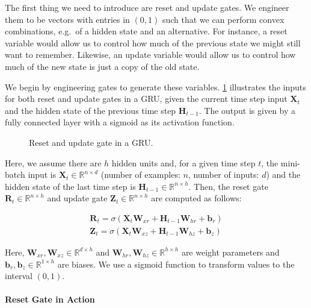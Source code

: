 The first thing we need to introduce are reset and update gates. We engineer them to be vectors with entries in $(0,1)$ such that we can perform convex combinations, e.g.\ of a hidden state and an alternative. For instance, a reset variable would allow us to control how much of the previous state we might still want to remember. Likewise, an update variable would allow us to control how much of the new state is just a copy of the old state.

We begin by engineering gates to generate these variables. \cref{fig:gru_1} illustrates the inputs for both reset and update gates in a GRU, given the current time step input $\mathbf{X}_t$ and the hidden state of the previous time step $\mathbf{H}_{t-1}$. The output is given by a fully connected layer with a sigmoid as its activation function.

\begin{figure}[hpt]
	\centering
	
	\caption{Reset and update gate in a GRU.}
	\label{fig:gru_1}
\end{figure}

Here, we assume there are $h$ hidden units and, for a given time step $t$, the mini-batch input is $\mathbf{X}_t \in \mathbb{R}^{n \times d}$ (number of examples: $n$, number of inputs: $d$) and the hidden state of the last time step is $\mathbf{H}_{t-1} \in \mathbb{R}^{n \times h}$. Then, the reset gate $\mathbf{R}_t \in \mathbb{R}^{n \times h}$ and update gate $\mathbf{Z}_t \in \mathbb{R}^{n \times h}$ are computed as follows:

$$
\begin{aligned}
\mathbf{R}_t = \sigma(\mathbf{X}_t \mathbf{W}_{xr} + \mathbf{H}_{t-1} \mathbf{W}_{hr} + \mathbf{b}_r)\\
\mathbf{Z}_t = \sigma(\mathbf{X}_t \mathbf{W}_{xz} + \mathbf{H}_{t-1} \mathbf{W}_{hz} + \mathbf{b}_z)
\end{aligned}
$$

Here, $\mathbf{W}_{xr}, \mathbf{W}_{xz} \in \mathbb{R}^{d \times h}$ and $\mathbf{W}_{hr}, \mathbf{W}_{hz} \in \mathbb{R}^{h \times h}$ are weight parameters and $\mathbf{b}_r, \mathbf{b}_z \in \mathbb{R}^{1 \times h}$ are biases. We use a sigmoid function to transform values to the interval $(0,1)$.

\paragraph{Reset Gate in Action}

